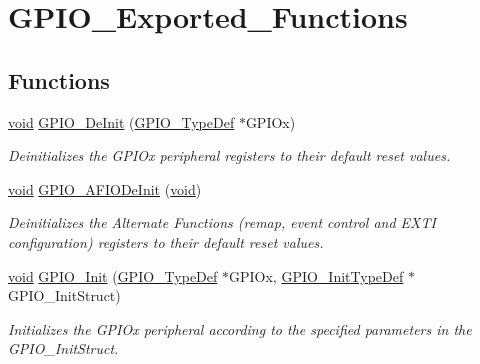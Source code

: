\hypertarget{group___g_p_i_o___exported___functions}{}\section{G\+P\+I\+O\+\_\+\+Exported\+\_\+\+Functions}
\label{group___g_p_i_o___exported___functions}
\subsection*{Functions}
\begin{DoxyCompactItemize}
\item 
\hyperlink{usb__devapi_8h_afabf60e7f57651d6d595a02c75f07cd0}{void} \hyperlink{group___g_p_i_o___exported___functions_gaa60bdf3182c44b5fa818f237042f52ee}{G\+P\+I\+O\+\_\+\+De\+Init} (\hyperlink{struct_g_p_i_o___type_def}{G\+P\+I\+O\+\_\+\+Type\+Def} $\ast$G\+P\+I\+Ox)
\begin{DoxyCompactList}\small\item\em Deinitializes the G\+P\+I\+Ox peripheral registers to their default reset values. \end{DoxyCompactList}\item 
\hyperlink{usb__devapi_8h_afabf60e7f57651d6d595a02c75f07cd0}{void} \hyperlink{group___g_p_i_o___exported___functions_ga7f645e6b6146818c3d6c19021e70170c}{G\+P\+I\+O\+\_\+\+A\+F\+I\+O\+De\+Init} (\hyperlink{usb__devapi_8h_afabf60e7f57651d6d595a02c75f07cd0}{void})
\begin{DoxyCompactList}\small\item\em Deinitializes the Alternate Functions (remap, event control and E\+X\+TI configuration) registers to their default reset values. \end{DoxyCompactList}\item 
\hyperlink{usb__devapi_8h_afabf60e7f57651d6d595a02c75f07cd0}{void} \hyperlink{group___g_p_i_o___exported___functions_ga71abf9404261370d03cca449b88d3a65}{G\+P\+I\+O\+\_\+\+Init} (\hyperlink{struct_g_p_i_o___type_def}{G\+P\+I\+O\+\_\+\+Type\+Def} $\ast$G\+P\+I\+Ox, \hyperlink{struct_g_p_i_o___init_type_def}{G\+P\+I\+O\+\_\+\+Init\+Type\+Def} $\ast$G\+P\+I\+O\+\_\+\+Init\+Struct)
\begin{DoxyCompactList}\small\item\em Initializes the G\+P\+I\+Ox peripheral according to the specified parameters in the G\+P\+I\+O\+\_\+\+Init\+Struct. \end{DoxyCompactList}\item 

\end{DoxyCompactItemize}
